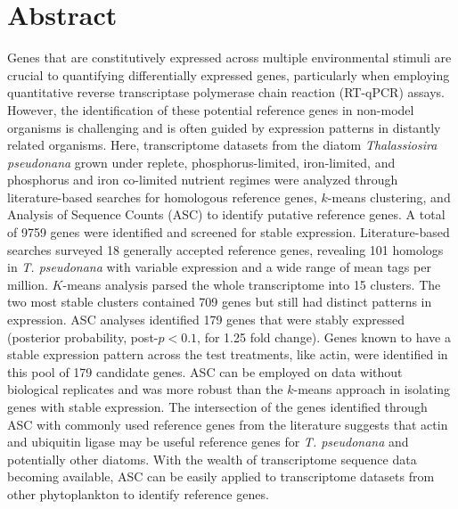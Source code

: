 \clearpage

\section{Abstract}
Genes that are constitutively expressed across multiple environmental stimuli are crucial to quantifying differentially expressed genes, particularly when employing quantitative reverse transcriptase polymerase chain reaction (RT-qPCR) assays. However, the identification of these potential reference genes in non-model organisms is challenging and is often guided by expression patterns in distantly related organisms. Here, transcriptome datasets from the diatom \textit{Thalassiosira pseudonana} grown under replete, phosphorus-limited, iron-limited, and phosphorus and iron co-limited nutrient regimes were analyzed through literature-based searches for homologous reference genes, $k$-means clustering, and Analysis of Sequence Counts (ASC) to identify putative reference genes. A total of 9759 genes were identified and screened for stable expression. Literature-based searches surveyed 18 generally accepted reference genes, revealing 101 homologs in \textit{T. pseudonana} with variable expression and a wide range of mean tags per million. $K$-means analysis parsed the whole transcriptome into 15 clusters. The two most stable clusters contained 709 genes but still had distinct patterns in expression. ASC analyses identified 179 genes that were stably expressed (posterior probability, post-$p<0.1$, for 1.25 fold change). Genes known to have a stable expression pattern across the test treatments, like actin, were identified in this pool of 179 candidate genes. ASC can be employed on data without biological replicates and was more robust than the $k$-means approach in isolating genes with stable expression. The intersection of the genes identified through ASC with commonly used reference genes from the literature suggests that actin and ubiquitin ligase may be useful reference genes for \textit{T. pseudonana} and potentially other diatoms. With the wealth of transcriptome sequence data becoming available, ASC can be easily applied to transcriptome datasets from other phytoplankton to identify reference genes.
 
